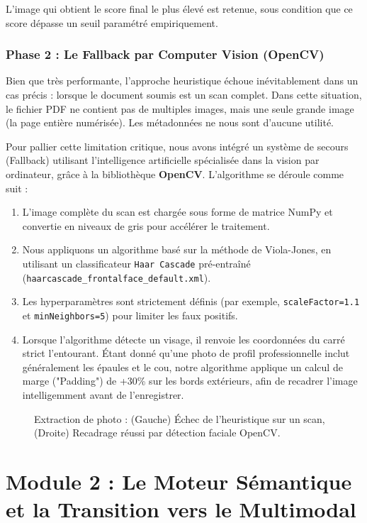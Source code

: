L'image qui obtient le score final le plus élevé est retenue, sous condition que ce score dépasse un seuil paramétré empiriquement.

\subsubsection{Phase 2 : Le Fallback par Computer Vision (OpenCV)}
Bien que très performante, l'approche heuristique échoue inévitablement dans un cas précis : lorsque le document soumis est un scan complet. Dans cette situation, le fichier PDF ne contient pas de multiples images, mais une seule grande image (la page entière numérisée). Les métadonnées ne nous sont d'aucune utilité.

Pour pallier cette limitation critique, nous avons intégré un système de secours (Fallback) utilisant l'intelligence artificielle spécialisée dans la vision par ordinateur, grâce à la bibliothèque \textbf{OpenCV}. L'algorithme se déroule comme suit :
\begin{enumerate}
    \item L'image complète du scan est chargée sous forme de matrice NumPy et convertie en niveaux de gris pour accélérer le traitement.
    \item Nous appliquons un algorithme basé sur la méthode de Viola-Jones, en utilisant un classificateur \texttt{Haar Cascade} pré-entraîné (\texttt{haarcascade\_frontalface\_default.xml}).
    \item Les hyperparamètres sont strictement définis (par exemple, \texttt{scaleFactor=1.1} et \texttt{minNeighbors=5}) pour limiter les faux positifs.
    \item Lorsque l'algorithme détecte un visage, il renvoie les coordonnées du carré strict l'entourant. Étant donné qu'une photo de profil professionnelle inclut généralement les épaules et le cou, notre algorithme applique un calcul de marge ("Padding") de +30\% sur les bords extérieurs, afin de recadrer l'image intelligemment avant de l'enregistrer.
\end{enumerate}

\begin{figure}[H]
    \centering
    \vspace{8cm} %
    \caption{Extraction de photo : (Gauche) Échec de l'heuristique sur un scan, (Droite) Recadrage réussi par détection faciale OpenCV.}
    \label{fig:photo_extraction}
\end{figure}


\section{Module 2 : Le Moteur Sémantique et la Transition vers le Multimodal}

